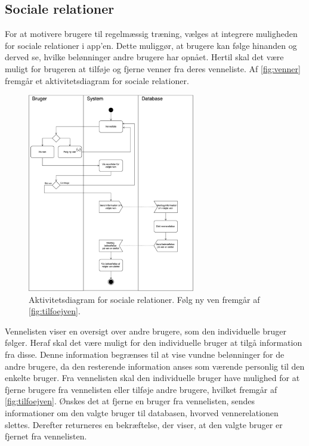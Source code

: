 \subsection*{Sociale relationer} 
For at motivere brugere til regelmæssig træning, vælges at integrere muligheden for sociale relationer i app'en. Dette muliggør, at brugere kan følge hinanden og derved se, hvilke belønninger andre brugere har opnået. Hertil skal det være muligt for brugeren at tilføje og fjerne venner fra deres venneliste. 
Af \autoref{fig:venner} fremgår et aktivitetsdiagram for sociale relationer. 

\begin{figure} [H]
\centering
\includegraphics[width=0.65\textwidth]{figures/aktivitetsdiagram/venner}
\caption{Aktivitetsdiagram for sociale relationer. Følg ny ven fremgår af \autoref{fig:tilfoejven}.}
\label{fig:venner}
\end{figure}

\noindent
Vennelisten viser en oversigt over andre brugere, som den individuelle bruger følger. Heraf skal det være muligt for den individuelle bruger at tilgå information fra disse. Denne information begrænses til at vise vundne belønninger for de andre brugere, da den resterende information anses som værende personlig til den enkelte bruger. 
Fra vennelisten skal den individuelle bruger have mulighed for at fjerne brugere fra vennelisten eller tilføje andre brugere, hvilket fremgår af \autoref{fig:tilfoejven}.  
Ønskes det at fjerne en bruger fra vennelisten, sendes informationer om den valgte bruger til databasen, hvorved vennerelationen slettes. Derefter returneres en bekræftelse, der viser, at den valgte bruger er fjernet fra vennelisten. 

